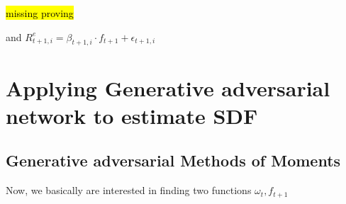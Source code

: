 \documentclass[11pt, oneside]{article}   	%
\begin{document}
\hl{missing proving}

and $R^e_{t+1, i} = \beta_{t+1, i}\cdot f_{t+1} + \epsilon_{t+1, i}$

\section{Applying Generative adversarial network to estimate SDF}

\subsection{Generative adversarial Methods of Moments}

Now, we basically are interested in finding two functions $\omega_t, f_{t+1}$
\end{document}
